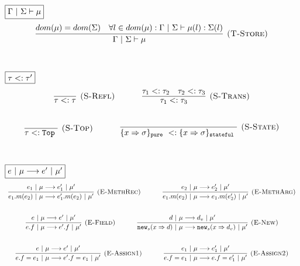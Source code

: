 \documentclass{llncs}
\newcommand{\keywadj}[1]{\mathtt{#1}}
\newcommand{\keyw}[1]{\keywadj{#1}~}
\begin{document}
$\fbox{$\Gamma~|~\Sigma \vdash \mu$}$
\[
\begin{array}{c}

\infer[\textsc{(T-Store)}]
  {\Gamma~|~\Sigma \vdash \mu}
  {dom(\mu) = dom(\Sigma) & \forall l \in dom(\mu) : \Gamma~|~\Sigma \vdash \mu(l) : \Sigma(l)}\\[5ex]

\end{array}
\]

$\fbox{$\tau <: \tau'$}$
\[
\begin{array}{c}
\infer[\textsc{(S-Refl)}]
  {\tau <: \tau}
  {}%
~~~~~~~~~~
\infer[\textsc{(S-Trans)}]
  {\tau_1 <: \tau_3}
  {\tau_1 <: \tau_2 & \tau_2 <: \tau_3}\\[5ex]

\infer[\textsc{(S-Top)}]
  {\tau <: \keyw{Top}}
  {}%
~~~~~~~~~~
\infer[\textsc{(S-State)}]
  {\{ x \Rightarrow \sigma \}_{\keyw{pure}} <: \{ x \Rightarrow \sigma \}_{\keyw{stateful}}}
  {}\\[5ex]  

\end{array}
\]


$\fbox{$e~|~\mu \longrightarrow e'~|~\mu'$}$
\[
\begin{array}{c}
\infer[\textsc{(E-MethRec)}]
  {e_1.m(e_2)~|~\mu \longrightarrow e_1'.m(e_2)~|~\mu'}
  {e_1~|~\mu \longrightarrow e_1'~|~\mu'}%
~~~~~~~~~~
\infer[\textsc{(E-MethArg)}]
  {e_1.m(e_2)~|~\mu \longrightarrow e_1.m(e_2')~|~\mu'}
  {e_2~|~\mu \longrightarrow e_2'~|~\mu'}\\[5ex]

\infer[\textsc{(E-Field)}]
  {e.f~|~\mu \longrightarrow e'.f~|~\mu'}
  {e~|~\mu \longrightarrow e'~|~\mu'}%
~~~~~~~~~~
\infer[\textsc{(E-New)}]
  {\keywadj{new}_{s}(x \Rightarrow d)~|~\mu \longrightarrow \keywadj{new}_{s}(x \Rightarrow d_v)~|~\mu'}
  {d~|~\mu \longrightarrow d_v~|~\mu'}\\[5ex]

\infer[\textsc{(E-Assign1)}]
  {e.f = e_1~|~\mu \longrightarrow e'.f = e_1~|~\mu'}
  {e~|~\mu \longrightarrow e'~|~\mu'}%
~~~~~~~~~~
\infer[\textsc{(E-Assign2)}]
  {e.f = e_1~|~\mu \longrightarrow e.f = e_1'~|~\mu'}
  {e_1~|~\mu \longrightarrow e_1'~|~\mu'}\\[5ex]

\end{array}
\]
\end{document}
